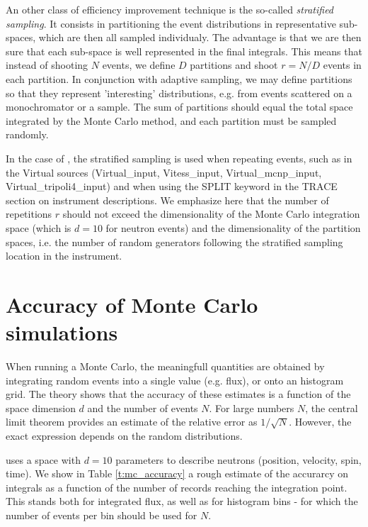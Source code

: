 An other class of efficiency improvement technique is the so-called \emph{stratified sampling}. It consists in partitioning the event distributions in representative sub-spaces, which are then all sampled individualy. The advantage is that we are then sure that each sub-space is well represented in the final integrals. This means that instead of shooting $N$ events, we define $D$ partitions and shoot $r=N/D$ events in each partition. In conjunction with adaptive sampling, we may define partitions so that they represent 'interesting' distributions, e.g. from events scattered on a monochromator or a sample. The sum of partitions should equal the total space integrated by the Monte Carlo method, and each partition must be sampled randomly.

In the case of \MCS, the stratified sampling is used when repeating events, such as in the Virtual sources (Virtual\_input, Vitess\_input, Virtual\_mcnp\_input, Virtual\_tripoli4\_input) and when using the SPLIT keyword in the TRACE section on instrument descriptions. We emphasize here that the number of repetitions $r$ should not exceed the dimensionality of the Monte Carlo integration space (which is $d=10$ for neutron events) and the dimensionality of the partition spaces, i.e. the number of random generators following the stratified sampling location in the instrument.

\section{Accuracy of Monte Carlo simulations}

When running a Monte Carlo, the meaningfull quantities are obtained by integrating random events into a single value (e.g. flux), or onto an histogram grid. The theory \cite{James80} shows that the accuracy of these estimates is a function of the space dimension $d$ and the number of events $N$. For large numbers $N$, the central limit theorem provides an estimate of the relative error as $1/\sqrt{N}$. However, the exact expression depends on the random distributions.

\MCS uses a space with $d=10$ parameters to describe neutrons (position, velocity, spin, time). We show in Table \ref{t:mc_accuracy} a rough estimate of the accurarcy on integrals as a function of the number of records reaching the integration point. This stands both for integrated flux, as well as for histogram bins - for which the number of events per bin should be used for $N$.

